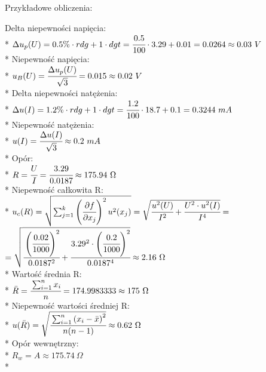 \documentclass{article}
\begin{document}
\begin{center}
    \begin{flushleft}
        Przykładowe obliczenia:\\
        \end{flushleft}
    Delta niepewności napięcia:\\*
    $\Delta u_p (U)  = 0.5\% \cdot rdg+1 \cdot dgt=\cfrac{0.5}{100} \cdot 3.29 + 0.01=0.0264\approx0.03 \ V$\\*
    Niepewność napięcia:\\*
    $u_B (U)=\cfrac{\Delta u_p(U)}{\sqrt{3}}=0.015\approx0.02 \ V$\\*
    Delta niepewności natężenia:\\* 
    $\Delta u(I) = 1.2\% \cdot rdg+1 \cdot dgt = \cfrac{1.2}{100} \cdot 18.7 +0.1 =0.3244 \ mA$\\*
    Niepewność natężenia:\\*
    $u(I)= \cfrac{\Delta u(I)}{\sqrt{3}} \approx 0.2 \ mA$\\*
    Opór:\\* 
    $R=\cfrac{U}{I} = \cfrac{3.29}{0.0187} \approx 175.94 \ \Omega$\\*
    Niepewność całkowita R:\\*
    $u_c (R)=\sqrt{\sum_{j=1}^{k}\left( \cfrac{\partial f}{\partial x_j}\right)^2 u^2 (x_j)}
    =\sqrt{\cfrac{u^2 (U)}{I^2} + \cfrac{U^2 \cdot u^2 (I)}{I^4}}=$
    $= \sqrt{\cfrac{\left(\cfrac{0.02}{1000}\right)^2}{0.0187^2} + \cfrac{3.29^2 \cdot \left(\cfrac{0.2}{1000}\right)^2}{0.0187^4}}\approx 2.16 \ \Omega$\\* 
    Wartość średnia R:\\* 
    $\bar{R} = \cfrac{\sum_{i=1}^{n}x_i}{n}=174.9983333 \approx 175 \ \Omega$\\*
    Niepewność wartości średniej R:\\*
    $u(\bar{R}) = \sqrt{\cfrac{\sum_{i=1}^{n} \left(x_i - \bar{x} \right)^2}{n(n-1)}}\approx 0.62 \ \Omega$\\*
    Opór wewnętrzny:\\* 
    $R_w =A\approx 175.74 \ \Omega$\\*

\end{center}
\newpage
\end{document}
